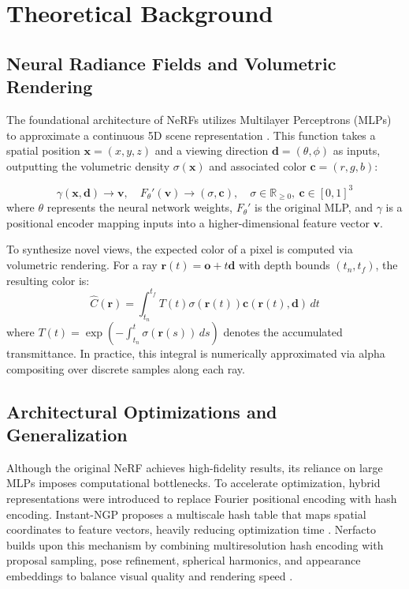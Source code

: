 \section{Theoretical Background}
\label{sec:fund}

\subsection{Neural Radiance Fields and Volumetric Rendering}
The foundational architecture of NeRFs utilizes Multilayer Perceptrons (MLPs) to approximate a continuous 5D scene representation \cite{mildenhall2020nerfrepresentingscenesneural}. This function takes a spatial position $\mathbf{x} = (x, y, z)$ and a viewing direction $\mathbf{d} = (\theta, \phi)$ as inputs, outputting the volumetric density $\sigma(\mathbf{x})$ and associated color $\mathbf{c} = (r, g, b)$:

$$
\gamma(\mathbf{x}, \mathbf{d}) \rightarrow \mathbf{v}, \quad F_\theta'(\mathbf{v}) \rightarrow (\sigma, \mathbf{c}), \quad \sigma \in \mathbb{R}_{\geq 0},\ \mathbf{c} \in [0, 1]^3
$$
where $\theta$ represents the neural network weights, $F_\theta'$ is the original MLP, and $\gamma$ is a positional encoder mapping inputs into a higher-dimensional feature vector $\mathbf{v}$.

To synthesize novel views, the expected color of a pixel is computed via volumetric rendering. For a ray $\mathbf{r}(t) = \mathbf{o} + t\mathbf{d}$ with depth bounds $(t_n, t_f)$, the resulting color is:
$$\hat{C}(\mathbf{r}) = \int_{t_n}^{t_f} T(t) \sigma(\mathbf{r}(t)) \mathbf{c}(\mathbf{r}(t), \mathbf{d}) \, dt$$
where $T(t) = \exp\left(-\int_{t_n}^t \sigma(\mathbf{r}(s)) \, ds\right)$ denotes the accumulated transmittance. In practice, this integral is numerically approximated via alpha compositing over discrete samples along each ray.

\subsection{Architectural Optimizations and Generalization}
Although the original NeRF achieves high-fidelity results, its reliance on large MLPs imposes computational bottlenecks. To accelerate optimization, hybrid representations were introduced to replace Fourier positional encoding with hash encoding. Instant-NGP proposes a multiscale hash table that maps spatial coordinates to feature vectors, heavily reducing optimization time \cite{muller2022}. Nerfacto builds upon this mechanism by combining multiresolution hash encoding with proposal sampling, pose refinement, spherical harmonics, and appearance embeddings to balance visual quality and rendering speed \cite{Tancik2023}.

